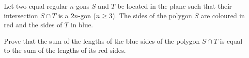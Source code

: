 Let two equal regular $n$-gons $S$ and $T$ be located in the plane such that their intersection $S\cap T$ is a $2n$-gon ($n\ge 3$). The sides of the polygon $S$ are coloured in red and the sides of $T$ in blue. 

Prove that the sum of the lengths of the blue sides of the polygon $S\cap T$ is equal to the sum of the lengths of its red sides.